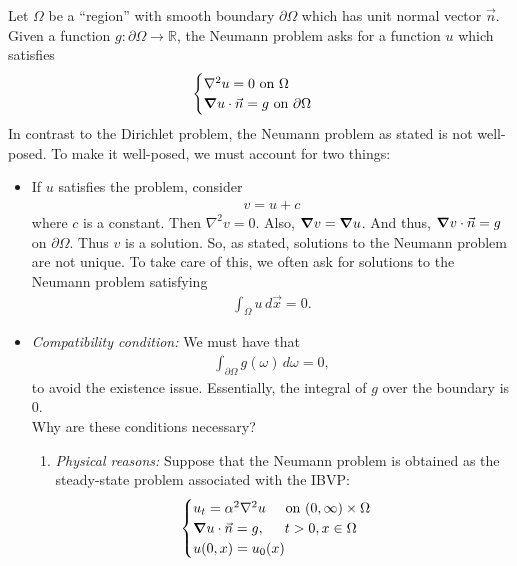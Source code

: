 \documentclass{book}
\theoremstyle{definition}
\newcommand{\p}{\partial}
\newcommand{\R}{\mathbb{R}}
\begin{document}
\begin{enumerate}
		Let $\Omega$ be a ``region'' with smooth boundary $\p \Omega$ which has unit normal vector $\vec{n}$. Given a function $g : \p \Omega \to \R$, the Neumann problem asks for a function $u$ which satisfies
		\begin{align*}
		\begin{cases}
		 \nabla^2 u = 0 \text{ on } \Omega\\
		 \grad{u} \cdot \vec{n} = g \text{ on }\p\Omega
		\end{cases}
		\end{align*} 
		In contrast to the Dirichlet problem, the Neumann problem as stated is not well-posed. To make it well-posed, we must account for two things:
		\begin{itemize}
			\item If $u$ satisfies the problem, consider
			\begin{align*}
			v = u + c
			\end{align*}
			where $c$ is a constant. Then $\nabla^2 v = 0$. Also, $\grad{v} = \grad{u}$. And thus, $\grad{v}\cdot \vec{n} = g$ on $\p\Omega$. Thus $v$ is a solution. So, as stated, solutions to the Neumann problem are not unique. To take care of this, we often ask for solutions to the Neumann problem satisfying
			\begin{align*}
			\int_\Omega u\,d\vec{x} = 0.
			\end{align*}
			\item \textit{Compatibility condition:} We must have that 
			\begin{align*}
			\int_{\p\Omega} g(\omega)\,d\omega = 0,
			\end{align*}
			to avoid the existence issue. Essentially, the integral of $g$ over the boundary is 0. \\
			
			Why are these conditions necessary? 
			\begin{enumerate}
				\item \textit{Physical reasons:} Suppose that the Neumann problem is obtained as the steady-state problem associated with the IBVP:
				\begin{align*}
				\begin{cases}
				u_t = \alpha^2 \nabla^2 u \hspace{0.5cm} \text{on $(0,\infty)\times \Omega$}\\
				\grad{u}\cdot \vec{n} = g, \hspace{0.5cm} t>0, x\in \Omega \\
				u(0,x) = u_0(x)
				\end{cases}
				\end{align*}
				

\end{enumerate}
\end{itemize}
\end{enumerate}
\end{document}
